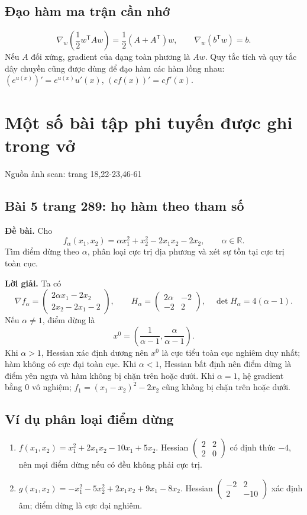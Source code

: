 \documentclass[11pt,a4paper]{article}
\newcommand{\R}{\mathbb{R}}
\newcommand{\grad}{\nabla}
\newcommand{\T}{^{\mathsf T}}
\newcommand{\src}[1]{\hfill{\footnotesize\color{gray}Nguồn ảnh scan: trang #1}}
\begin{document}
\subsection{Đạo hàm ma trận cần nhớ}
\[
\grad_w\left(\frac12 w\T A w\right)
=\frac12(A+A\T)w,\qquad
\grad_w(b\T w)=b.
\]
Nếu \(A\) đối xứng, gradient của dạng toàn phương là \(Aw\). Quy tắc tích và quy tắc dây chuyền cũng được dùng để đạo hàm các hàm lồng nhau: \((e^{u(x)})'=e^{u(x)}u'(x)\), \((c f(x))'=c f'(x)\).

\section{Một số bài tập phi tuyến được ghi trong vở}
\src{18,22-23,46-61}

\subsection{Bài 5 trang 289: họ hàm theo tham số}
\textbf{Đề bài.} Cho
\[
f_\alpha(x_1,x_2)=\alpha x_1^2+x_2^2-2x_1x_2-2x_2,\qquad \alpha\in\R.
\]
Tìm điểm dừng theo \(\alpha\), phân loại cực trị địa phương và xét sự tồn tại cực trị toàn cục.

\textbf{Lời giải.} Ta có
\[
\grad f_\alpha=
\begin{pmatrix}2\alpha x_1-2x_2\\2x_2-2x_1-2\end{pmatrix},
\qquad
H_\alpha=\begin{pmatrix}2\alpha&-2\\-2&2\end{pmatrix},
\quad \det H_\alpha=4(\alpha-1).
\]
Nếu \(\alpha\ne1\), điểm dừng là
\[
x^0=\left(\frac1{\alpha-1},\frac{\alpha}{\alpha-1}\right).
\]
Khi \(\alpha>1\), Hessian xác định dương nên \(x^0\) là cực tiểu toàn cục nghiêm duy nhất; hàm không có cực đại toàn cục. Khi \(\alpha<1\), Hessian bất định nên điểm dừng là điểm yên ngựa và hàm không bị chặn trên hoặc dưới. Khi \(\alpha=1\), hệ gradient bằng \(0\) vô nghiệm; \(f_1=(x_1-x_2)^2-2x_2\) cũng không bị chặn trên hoặc dưới.

\subsection{Ví dụ phân loại điểm dừng}
\begin{enumerate}
\item \(f(x_1,x_2)=x_1^2+2x_1x_2-10x_1+5x_2\). Hessian \(\begin{pmatrix}2&2\\2&0\end{pmatrix}\) có định thức \(-4\), nên mọi điểm dừng nếu có đều không phải cực trị.
\item \(g(x_1,x_2)=-x_1^2-5x_2^2+2x_1x_2+9x_1-8x_2\). Hessian \(\begin{pmatrix}-2&2\\2&-10\end{pmatrix}\) xác định âm; điểm dừng là cực đại nghiêm.
\end{enumerate}
\end{document}
